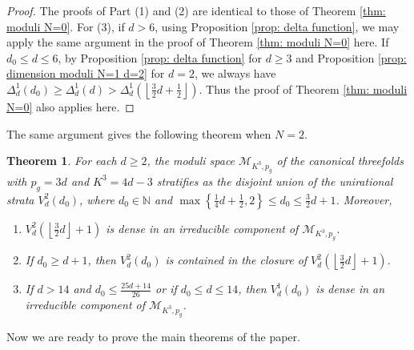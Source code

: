 \documentclass[a4paper,11pt]{amsart}
\newcommand{\M}{\ensuremath{\mathcal{M}}}
\newcommand{\NN}{\ensuremath{\mathbb{N}}}
\newtheorem{thm}{Theorem}[section]
\theoremstyle{definition}
\theoremstyle{remark}
\numberwithin{equation}{section}
\begin{document}
\begin{proof}
	The proofs of Part (1) and (2) are identical to those of Theorem \ref{thm: moduli N=0}. For (3), if $d > 6$, using Proposition \ref{prop: delta function}, we may apply the same argument in the proof of Theorem \ref{thm: moduli N=0} here. If $d_0 \le d \le 6$, by Proposition \ref{prop: delta function} for $d \ge 3$ and Proposition \ref{prop: dimension moduli N=1 d=2} for $d = 2$, we always have $\Delta^1_d(d_0) \ge \Delta^1_d(d) > \Delta^1_d \left(\left\lfloor \frac32 d + \frac12 \right\rfloor \right)$. Thus the proof of Theorem \ref{thm: moduli N=0} also applies here.
\end{proof}

The same argument gives the following theorem when $N = 2$.

\begin{thm} \label{thm: moduli N=2}
	For each $d \ge 2$, the moduli space $\M_{K^3, p_g}$ of the canonical threefolds with $p_g = 3d$ and $K^3 = 4d - 3$ stratifies as the disjoint union of the unirational strata $V^2_d(d_0)$, where $d_0 \in \NN$ and $\max \left\{ \frac14 d + \frac12, 2 \right\} \le d_0 \le \frac32 d + 1$. Moreover,
	\begin{enumerate}
		\item $V^2_d\left( \left\lfloor \frac32 d \right\rfloor + 1 \right)$ is dense in an irreducible component of $\M_{K^3, p_g}$.
		\item If $d_0 \ge d + 1$, then $V^2_d(d_0)$ is contained in the closure of $V^2_d \left(\left\lfloor \frac32 d\right\rfloor + 1 \right)$.
		\item If $d > 14$ and $d_0 \le \frac{25d + 14}{26}$ or if $d_0 \le d \le 14$, then $V^1_d(d_0)$ is dense in an irreducible component of $\M_{K^3, p_g}$.
	\end{enumerate}
\end{thm}

Now we are ready to prove the main theorems of the paper.
\end{document}
